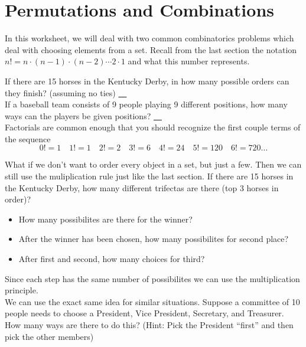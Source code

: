 \documentclass[14,fleqn]{article}
\begin{document}
\section*{Permutations and Combinations}
In this worksheet, we will deal with two common combinatorics problems which deal with choosing elements from a set. Recall from the last section the notation $n!=n\cdot (n-1)\cdot (n-2)\cdots 2\cdot 1$ and what this number represents.

If there are 15 horses in the Kentucky Derby, in how many possible orders can they finish? (assuming no ties) \underline{\ \hspace*{1 in}\ }\\[.4 in]
If a baseball team consists of 9 people playing 9 different positions, how many ways can the players be given positions? \underline{\ \hspace*{1 in}\ }\\[.4 in]
Factorials are common enough that you should recognize the first couple terms of the sequence
\[
	0!=1 \quad 1!=1 \quad 2!=2 \quad 3!=6 \quad 4!=24 \quad 5!=120 \quad 6!=720\dots
\]

What if we don't want to order every object in a set, but just a few. Then we can still use the muliplication rule just like the last section. If there are 15 horses in the Kentucky Derby, how many different trifectas are there (top 3 horses in order)?
\begin{itemize}
	\item How many possibilites are there for the winner?
	\item After the winner has been chosen, how many possibilites for second place?
	\item After first and second, how many choices for third?
\end{itemize}
Since each step has the same number of possibilites we can use the multiplication principle.\\[.3 in]

We can use the exact same idea for similar situations. Suppose a committee of 10 people needs to choose a President, Vice President, Secretary, and Treasurer. How many ways are there to do this? (Hint: Pick the President ``first'' and then pick the other members)\\[0.5 in]
\end{document}
